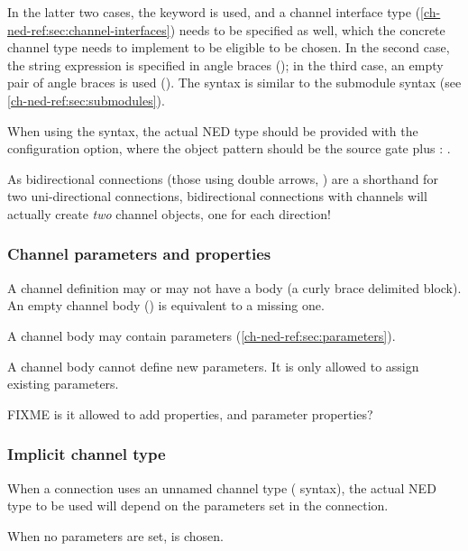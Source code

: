 In the latter two cases, the  keyword is used, and a
channel interface type (\ref{ch-ned-ref:sec:channel-interfaces})
needs to be specified as well, which the concrete channel type needs
to implement to be eligible to be chosen. In the second case, the
string expression is specified in angle braces (); in the
third case, an empty pair of angle braces is used (\ttt{<>}).
The syntax is similar to the submodule syntax (see \ref{ch-ned-ref:sec:submodules}).

\begin{note}
    When using the \ttt{<>} syntax, the actual NED type should be
    provided with the  configuration option,
    where the object pattern should be the source gate plus :
    .
\end{note}

\begin{note}
    As bidirectional connections (those using double arrows, \ttt{<-{}->})
    are a shorthand for two uni-directional connections, bidirectional
    connections with channels will actually create \textit{two} channel
    objects, one for each direction!
\end{note}


\subsubsection{Channel parameters and properties}

A channel definition may or may not have a body (a curly brace
delimited block). An empty channel body (\ttt{\{ \}}) is equivalent
to a missing one.

A channel body may contain parameters (\ref{ch-ned-ref:sec:parameters}).

A channel body cannot define new parameters. It is only
allowed to assign existing parameters.

FIXME is it allowed to add properties, and parameter properties?


\subsubsection{Implicit channel type}

When a connection uses an unnamed channel type (\ttt{-{}->
\{\ldots\} -{}->} syntax), the actual NED type to be used will depend on the
parameters set in the connection.

When no parameters are set,  is chosen.

